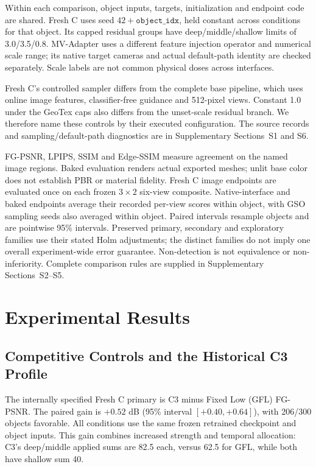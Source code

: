 \documentclass[times,twocolumn,final]{elsarticle}
\begin{document}
Within each comparison, object inputs, targets, initialization and endpoint code are shared. Fresh C uses seed $42+\texttt{object\_idx}$, held constant across conditions for that object. Its capped residual groups have deep/middle/shallow limits of 3.0/3.5/0.8. MV-Adapter uses a different feature injection operator and numerical scale range; its native target cameras and actual default-path identity are checked separately. Scale labels are not common physical doses across interfaces.

Fresh C's controlled sampler differs from the complete base pipeline, which uses online image features, classifier-free guidance and 512-pixel views. Constant 1.0 under the GeoTex caps also differs from the unset-scale residual branch. We therefore name these controls by their executed configuration. The source records and sampling/default-path diagnostics are in Supplementary Sections~S1 and S6.

FG-PSNR, LPIPS, SSIM and Edge-SSIM measure agreement on the named image regions. Baked evaluation renders actual exported meshes; unlit base color does not establish PBR or material fidelity. Fresh C image endpoints are evaluated once on each frozen $3\times2$ six-view composite. Native-interface and baked endpoints average their recorded per-view scores within object, with GSO sampling seeds also averaged within object. Paired intervals resample objects and are pointwise 95\% intervals. Preserved primary, secondary and exploratory families use their stated Holm adjustments; the distinct families do not imply one overall experiment-wide error guarantee. Non-detection is not equivalence or non-inferiority. Complete comparison rules are supplied in Supplementary Sections~S2--S5.

\section{Experimental Results}
\label{sec:experiments}

\subsection{Competitive Controls and the Historical C3 Profile}
\label{subsec:largescale}

The internally specified Fresh C primary is C3 minus Fixed Low (GFL) FG-PSNR. The paired gain is $+0.52$ dB (95\% interval $[+0.40,+0.64]$), with 206/300 objects favorable. All conditions use the same frozen retrained checkpoint and object inputs. This gain combines increased strength and temporal allocation: C3's deep/middle applied sums are 82.5 each, versus 62.5 for GFL, while both have shallow sum 40.
\end{document}
